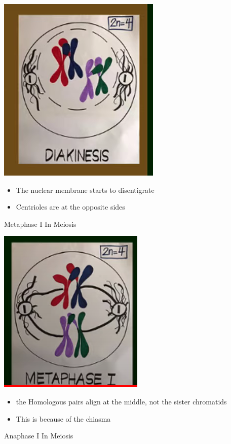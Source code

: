 \documentclass{article}
\begin{document}
\includegraphics*[scale=0.9]{diakineses.png}
\begin{itemize}
    \item The nuclear membrane starts to disentigrate
    \item Centrioles are at the opposite sides
\end{itemize}
Metaphase I In Meiosis


\includegraphics*[scale=0.9]{mim.png}
\begin{itemize}
    \item the Homologous pairs align at the middle, not the sister chromatids
    \item This is because of the chiasma
\end{itemize}
Anaphase I In Meiosis
\end{document}
